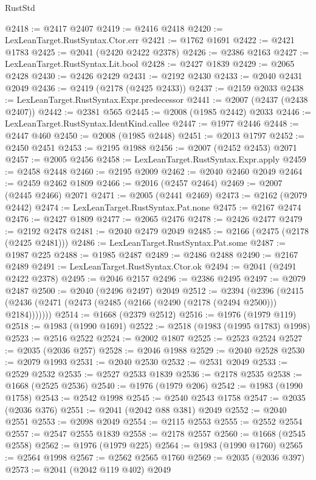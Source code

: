 \begin{lexlean}{RustStd}
\begin{coremodule}
@2418 := @2417 @2407
@2419 := @2416 @2418
@2420 := LexLeanTarget.RustSyntax.Ctor.err
@2421 := @1762 @1691
@2422 := @2421 @1783
@2425 := @2041 (@2420 @2422 @2378)
@2426 := @2386 @2163
@2427 := LexLeanTarget.RustSyntax.Lit.bool
@2428 := @2427 @1839
@2429 := @2065 @2428
@2430 := @2426 @2429
@2431 := @2192 @2430
@2433 := @2040 @2431 @2049
@2436 := @2419 (@2178 (@2425 @2433))
@2437 := @2159 @2033
@2438 := LexLeanTarget.RustSyntax.Expr.predecessor
@2441 := @2007 (@2437 (@2438 @2407))
@2442 := @2381 @565
@2445 := @2008 (@1985 @2442) @2033
@2446 := LexLeanTarget.RustSyntax.IdentKind.callee
@2447 := @1977 @2446
@2448 := @2447 @460
@2450 := @2008 (@1985 @2448)
@2451 := @2013 @1797
@2452 := @2450 @2451
@2453 := @2195 @1988
@2456 := @2007 (@2452 @2453) @2071
@2457 := @2005 @2456
@2458 := LexLeanTarget.RustSyntax.Expr.apply
@2459 := @2458 @2448
@2460 := @2195 @2009
@2462 := @2040 @2460 @2049
@2464 := @2459 @2462 @1809
@2466 := @2016 (@2457 @2464)
@2469 := @2007 (@2445 @2466) @2071
@2471 := @2005 (@2441 @2469)
@2473 := @2162 (@2079 @2442)
@2474 := LexLeanTarget.RustSyntax.Pat.none
@2475 := @2167 @2474
@2476 := @2427 @1809
@2477 := @2065 @2476
@2478 := @2426 @2477
@2479 := @2192 @2478
@2481 := @2040 @2479 @2049
@2485 := @2166 (@2475 (@2178 (@2425 @2481)))
@2486 := LexLeanTarget.RustSyntax.Pat.some
@2487 := @1987 @225
@2488 := @1985 @2487
@2489 := @2486 @2488
@2490 := @2167 @2489
@2491 := LexLeanTarget.RustSyntax.Ctor.ok
@2494 := @2041 (@2491 @2422 @2378)
@2495 := @2046 @2157
@2496 := @2386 @2495
@2497 := @2079 @2487
@2500 := @2040 (@2496 @2497) @2049
@2512 := @2394
    (@2396 (@2415 (@2436 (@2471 (@2473 (@2485 (@2166 (@2490 (@2178 (@2494 @2500))) @2184)))))))
@2514 := @1668 (@2379 @2512)
@2516 := @1976 (@1979 @119)
@2518 := @1983 (@1990 @1691)
@2522 := @2518 (@1983 (@1995 @1783) @1998)
@2523 := @2516 @2522
@2524 := @2002 @1807
@2525 := @2523 @2524
@2527 := @2035 (@2036 @257)
@2528 := @2046 @1988
@2529 := @2040 @2528
@2530 := @2079 @1993
@2531 := @2040 @2530
@2532 := @2531 @2049
@2533 := @2529 @2532
@2535 := @2527 @2533 @1839
@2536 := @2178 @2535
@2538 := @1668 (@2525 @2536)
@2540 := @1976 (@1979 @206)
@2542 := @1983 (@1990 @1758)
@2543 := @2542 @1998
@2545 := @2540 @2543 @1758
@2547 := @2035 (@2036 @376)
@2551 := @2041 (@2042 @88 @381) @2049
@2552 := @2040 @2551
@2553 := @2098 @2049
@2554 := @2115 @2553
@2555 := @2552 @2554
@2557 := @2547 @2555 @1839
@2558 := @2178 @2557
@2560 := @1668 (@2545 @2558)
@2562 := @1976 (@1979 @225)
@2564 := @1983 (@1990 @1760)
@2565 := @2564 @1998
@2567 := @2562 @2565 @1760
@2569 := @2035 (@2036 @397)
@2573 := @2041 (@2042 @119 @402) @2049

\end{coremodule}
\end{lexlean}
